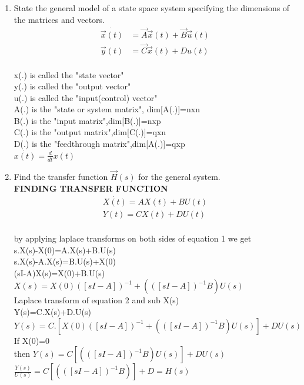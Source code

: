 \begin{enumerate}[label=\thesection.\arabic*.,ref=\thesection.\theenumi]
\item State the general model of a state space system specifying the dimensions of the matrices and vectors.
\\
\solution 
\begin{align}
\dot{\vec{x}(t)}&=\vec{A}\vec{x}(t)+\vec{B}\vec{u}(t) \\
 \vec{y}(t)&=\vec{C}\vec{x}(t)+D u(t)
\end{align}
\\ x(.) is called the "state vector"
\\ y(.) is called the "output vector"
\\ u(.) is called the "input(control) vector"
\\ A(.) is the "state or system matrix", dim[A(.)]=nxn
\\ B(.) is the "input matrix",dim[B(.)]=nxp
\\ C(.) is the "output matrix",dim[C(.)]=qxn
\\ D(.) is the "feedthrough matrix",dim[A(.)]=qxp
\\ $\dot{x(t)}=\frac{d}{dt}x(t)$
\\
\item Find the transfer function $\vec{H}(s)$ for the general system.
\solution
\\ \textbf{FINDING TRANSFER FUNCTION}
\begin{align}
 \dot{X(t)}=AX(t)+BU(t) \\
 Y(t)=CX(t)+DU(t)
\end{align}    
\\by applying laplace transforms on both sides of equation 1
we get
\\s.X(s)-X(0)=A.X(s)+B.U(s)
\\s.X(s)-A.X(s)=B.U(s)+X(0)
\\(sI-A)X(s)=X(0)+B.U(s)
\\$X(s)=X(0)([sI-A])^{-1}+(([sI-A])^{-1}B)U(s)$
\\Laplace transform of equation 2 and sub X(s) 
\\Y(s)=C.X(s)+D.U(s)
\\$Y(s)=C.[X(0)([sI-A])^{-1 }+ (([sI-A])^{-1}B)U(s)]+DU(s)$
\\If X(0)=0
\\then $Y(s)=C[(([sI-A])^{-1}B)U(s)]+DU(s)$
\\$\frac{Y(s)}{U(s)}=C[(([sI-A])^{-1}B)]+D=H(s)$
\\

\end{enumerate}
